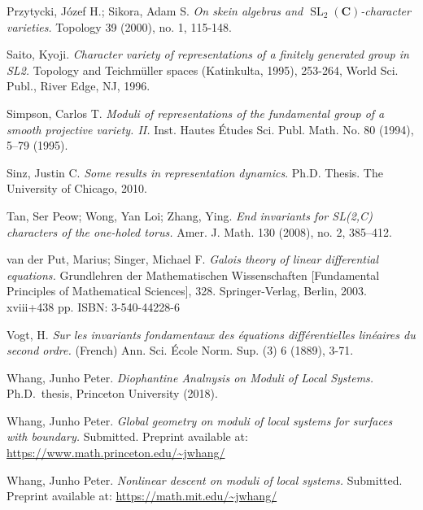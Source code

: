 \documentclass[reqno]{amsart}
\theoremstyle{plain}
\theoremstyle{definition}
\theoremstyle{remark}
\newcommand{\Cb}{{\mathbf{C}}}
\DeclareMathOperator{\SL}{SL}
\begin{document}
\begin{thebibliography}{99}
Przytycki, J\'ozef H.; Sikora, Adam S.
\emph{On skein algebras and $\SL_2(\Cb)$-character varieties.}
Topology 39 (2000), no. 1, 115-148.

Saito, Kyoji.
\emph{Character variety of representations of a finitely generated group in SL2.} Topology and Teichm\"uller spaces (Katinkulta, 1995), 253-264, World Sci. Publ., River Edge, NJ, 1996. 

Simpson, Carlos T.
\emph{Moduli of representations of the fundamental group of a smooth projective variety. II.}
Inst. Hautes \'Etudes Sci. Publ. Math. No. 80 (1994), 5--79 (1995).

Sinz, Justin C.
\emph{Some results in representation dynamics}.
Ph.D. Thesis. The University of Chicago, 2010.

Tan, Ser Peow; Wong, Yan Loi; Zhang, Ying.
\emph{End invariants for SL(2,C) characters of the one-holed torus.}
Amer. J. Math. 130 (2008), no. 2, 385--412. 


van der Put, Marius; Singer, Michael F.
\emph{Galois theory of linear differential equations.} 
Grundlehren der Mathematischen Wissenschaften [Fundamental Principles of Mathematical Sciences], 328.
Springer-Verlag, Berlin, 2003. xviii+438 pp. ISBN: 3-540-44228-6

Vogt, H.
\emph{Sur les invariants fondamentaux des \'equations diff\'erentielles lin\'eaires du second ordre.} (French) 
Ann. Sci. École Norm. Sup. (3) 6 (1889), 3-71.

Whang, Junho Peter.
\emph{Diophantine Analnysis on Moduli of Local Systems.}
Ph.D.~thesis, Princeton University (2018).

Whang, Junho Peter.
\emph{Global geometry on moduli of local systems for surfaces with boundary.}
Submitted. Preprint available at: \href{https://www.math.princeton.edu/~jwhang/}{https://www.math.princeton.edu/\textasciitilde jwhang/}

Whang, Junho Peter.
\emph{Nonlinear descent on moduli of local systems.}
Submitted. Preprint available at: \href{https://math.mit.edu/~jwhang/}{https://math.mit.edu/\textasciitilde jwhang/}

\end{thebibliography}
\end{document}
